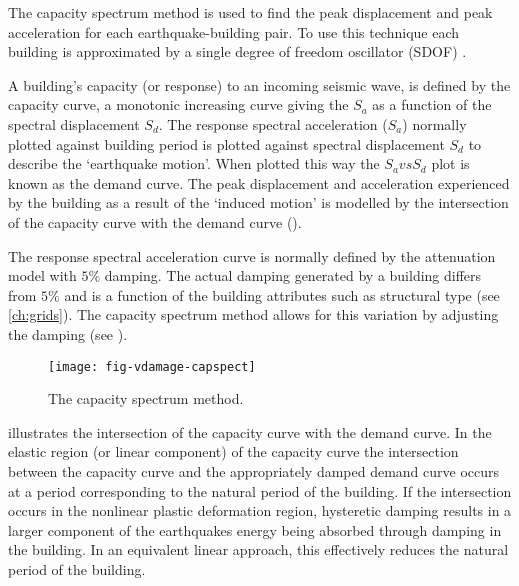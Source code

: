 The capacity spectrum method is
used to find the peak displacement and
peak acceleration for each
earthquake-building pair. To use this technique each building is
approximated by a single degree of freedom oscillator (SDOF)
\citep{dr_Chopra01c}.

A building's capacity (or response) to an incoming seismic wave,
is defined by the capacity curve, a
monotonic increasing curve giving the $S_a$ as a function of the
spectral displacement $S_d$.
The response spectral acceleration ($S_a$) normally plotted against building period is
plotted against spectral displacement $S_d$ to describe the `earthquake motion'. When
plotted this way the $S_a vs S_d$ plot is known as the demand
curve. The peak displacement and acceleration experienced by the building as a
result of the `induced motion' is modelled by the intersection of
the capacity curve with the demand
curve ().

The response spectral acceleration curve is normally defined by the attenuation model
with $5\%$ damping.  The actual damping generated by a building
differs from $5\%$ and is a function of the building attributes
such as structural type (see \cref{ch:grids}). The capacity
spectrum method allows for this
variation by adjusting the damping (see
).

\begin{figure}[htp]
\centering {}
 
\texttt{[image: fig-vdamage-capspect]}
\caption{The capacity spectrum method.} \label{fig:vdamage-capspect}
\end{figure}


 illustrates the intersection of the
capacity curve with the demand
curve.  In the elastic region (or linear
component) of the capacity curve the
intersection between the capacity curve and
the appropriately damped demand curve occurs
at a period corresponding to the natural period of the building.
If the intersection occurs in the nonlinear plastic deformation
region, hysteretic damping results in a larger component of the
earthquakes energy being absorbed through damping in the building.
In an equivalent linear approach, this effectively reduces the
natural period of the building.


